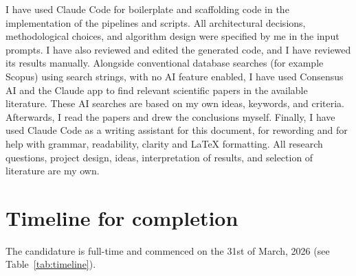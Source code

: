 I have used Claude Code for boilerplate and scaffolding code in the implementation of the
pipelines and scripts. All architectural decisions, methodological choices, and algorithm design
were specified by me in the input prompts. I have also reviewed and edited the generated code, and
I have reviewed its results manually.
Alongside conventional database searches (for example
Scopus) using search strings, with no AI feature enabled, I have used Consensus AI and the Claude
app to find relevant scientific papers in the available literature. These AI searches are based on
my own ideas, keywords, and criteria. Afterwards, I read the papers and drew the conclusions
myself. Finally, I have used Claude Code as a writing assistant for this document, for rewording
and for help with grammar, readability, clarity and LaTeX formatting. All research questions,
project design, ideas, interpretation of results, and selection of literature are my own.

\section{Timeline for completion}
\label{sec:timeline}

The candidature is full-time and commenced on the 31st of March, 2026 (see Table~\ref{tab:timeline}).

